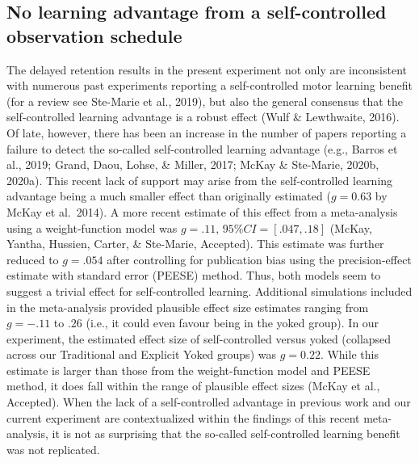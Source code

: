\documentclass[
  english,
  man, donotrepeattitle,floatsintext]{apa7}
\begin{document}
\hypertarget{no-learning-advantage-from-a-self-controlled-observation-schedule}{%
\subsection{No learning advantage from a self-controlled observation schedule}\label{no-learning-advantage-from-a-self-controlled-observation-schedule}}

The delayed retention results in the present experiment not only are inconsistent with numerous past experiments reporting a self-controlled motor learning benefit (for a review see Ste-Marie et al., 2019), but also the general consensus that the self-controlled learning advantage is a robust effect (Wulf \& Lewthwaite, 2016). Of late, however, there has been an increase in the number of papers reporting a failure to detect the so-called self-controlled learning advantage (e.g., Barros et al., 2019; Grand, Daou, Lohse, \& Miller, 2017; McKay \& Ste-Marie, 2020b, 2020a). This recent lack of support may arise from the self-controlled learning advantage being a much smaller effect than originally estimated (\(g = 0.63\) by McKay et al.~2014). A more recent estimate of this effect from a meta-analysis using a weight-function model was \(g = .11, \,95\% CI = [.047, .18]\) (McKay, Yantha, Hussien, Carter, \& Ste-Marie, Accepted). This estimate was further reduced to \(g = .054\) after controlling for publication bias using the precision-effect estimate with standard error (PEESE) method. Thus, both models seem to suggest a trivial effect for self-controlled learning. Additional simulations included in the meta-analysis provided plausible effect size estimates ranging from \(g = -.11\) to \(.26\) (i.e., it could even favour being in the yoked group). In our experiment, the estimated effect size of self-controlled versus yoked (collapsed across our Traditional and Explicit Yoked groups) was \(g = 0.22\). While this estimate is larger than those from the weight-function model and PEESE method, it does fall within the range of plausible effect sizes (McKay et al., Accepted). When the lack of a self-controlled advantage in previous work and our current experiment are contextualized within the findings of this recent meta-analysis, it is not as surprising that the so-called self-controlled learning benefit was not replicated.
\end{document}

